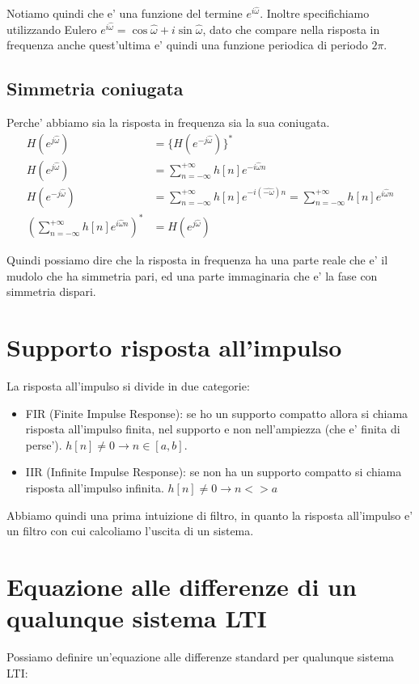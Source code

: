 Notiamo quindi che e' una funzione del termine $e^{i \hat{\omega}}$.
Inoltre specifichiamo utilizzando Eulero $e^{i \hat{\omega}} = \cos \hat{\omega} + i \sin \hat{\omega}$, dato che compare nella risposta in frequenza anche quest'ultima e' quindi una funzione periodica di periodo $2\pi$.

\subsection{Simmetria coniugata}
Perche' abbiamo sia la risposta in frequenza sia la sua coniugata.
\[\begin{split}
    H(e^{j \hat{\omega}}) &= \{ H(e^{-j \hat{\omega}}) \}^* \\
    H(e^{j \hat{\omega}}) &= \sum_{n = - \infty}^{+ \infty} h[n] e^{-i \hat{\omega}n} \\
    H(e^{-j \hat{\omega}}) &= \sum_{n = - \infty}^{+ \infty} h[n] e^{-i (\hat{- \omega}) n} = \sum_{n = - \infty}^{+ \infty} h[n] e^{i \hat{\omega}n} \\
    (\sum_{n = - \infty}^{+ \infty} h[n] e^{i \hat{\omega}n})^* &= H(e^{j \hat{\omega}})
\end{split}\]

Quindi possiamo dire che la risposta in frequenza ha una parte reale che e' il mudolo che ha simmetria pari, ed una parte immaginaria che e' la fase con simmetria dispari.

\section{Supporto risposta all'impulso}
La risposta all'impulso si divide in due categorie:
\begin{itemize}
    \item FIR (Finite Impulse Response): se ho un supporto compatto allora si chiama risposta all'impulso finita, nel supporto e non nell'ampiezza (che e' finita di perse'). $h[n] \neq 0 \rightarrow n \in [a,b]$.
    \item IIR (Infinite Impulse Response): se non ha un supporto compatto si chiama risposta all'impulso infinita. $h[n] \neq 0 \rightarrow n < > a$
\end{itemize}

Abbiamo quindi una prima intuizione di filtro, in quanto la risposta all'impulso e' un filtro con cui calcoliamo l'uscita di un sistema.

\section{Equazione alle differenze di un qualunque sistema LTI}
Possiamo definire un'equazione alle differenze standard per qualunque sistema LTI:

